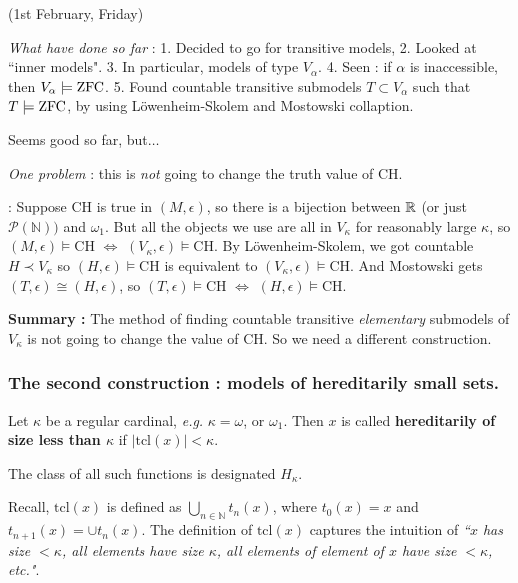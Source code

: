 \documentclass[12pt,a4paper]{article}
\newenvironment{subproof}
{\begin{changemargin}{0.5cm}{0.5cm} 
	}%
	{\end{changemargin}
}
\begin{document}
\s

\newday

(1st February, Friday)
\s

\emph{What have done so far} : 1. Decided to go for transitive models, 2. Looked at ``inner models". 3. In particular, models of type $V_{\alpha}$. 4. Seen : if $\alpha$ is inaccessible, then $V_{\alpha} \models \text{ZFC}$. 5. Found countable transitive submodels $T \subset V_{\alpha}$ such that $T\models \text{ZFC}$, by using L\"owenheim-Skolem and Mostowski collaption.
\s

Seems good so far, but$\ldots$

\emph{One problem} : this is \emph{not} going to change the truth value of CH.
\begin{subproof}
: Suppose CH is true in $(M, \epsilon)$, so there is a bijection between $\mathbb{R}$ (or just $\mathscr{P}(\mathbb{N}))$ and $\omega_1$. But all the objects we use are all in $V_{\kappa}$ for reasonably large $\kappa$, so $(M, \epsilon) \models$CH $\Leftrightarrow$ $(V_{\kappa}, \epsilon) \models$CH. By L\"owenheim-Skolem, we got countable $H \prec V_{\kappa}$ so $(H, \epsilon) \models$CH is equivalent to $(V_{\kappa}, \epsilon)\models$CH. And Mostowski gets $(T, \epsilon) \cong (H, \epsilon)$, so $(T, \epsilon)\models$CH $\Leftrightarrow$ $(H, \epsilon) \models$CH.
\end{subproof}
\s

\textbf{Summary :} The method of finding countable transitive \emph{elementary} submodels of $V_{\kappa}$ is not going to change the value of CH. So we need a different construction.
\s

\subsubsection*{The second construction : models of hereditarily small sets.}

 Let $\kappa$ be a regular cardinal, \textit{e.g.} $\kappa =\omega$, or $\omega_1$. Then $x$ is called \textbf{hereditarily of size less than $\kappa$} if $|\text{tcl}(x)|< \kappa$.

\quad The class of all such functions is designated $H_{\kappa}$.
\s

Recall, $\text{tcl}(x)$ is defined as $\bigcup_{n\in \mathbb{N}} t_n(x)$, where $t_0(x)=x$ and $t_{n+1} (x) = \cup t_n(x)$. The definition of $\text{tcl}(x)$ captures the intuition of \emph{``$x$ has size $< \kappa$, all elements have size $\kappa$, all elements of element of $x$ have size $<\kappa$, etc."}.
\s
\end{document}
